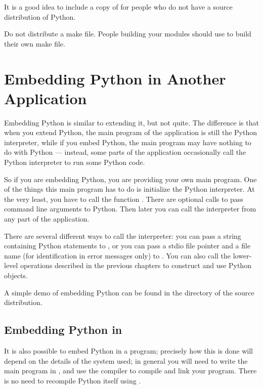 \documentclass{manual}
\begin{document}
It is a good idea to include a copy of  for
people who do not have a source distribution of Python.

Do not distribute a make file.  People building your modules
should use  to build their own make file.


\chapter{Embedding Python in Another Application
         \label{embedding}}

Embedding Python is similar to extending it, but not quite.  The
difference is that when you extend Python, the main program of the
application is still the Python interpreter, while if you embed
Python, the main program may have nothing to do with Python ---
instead, some parts of the application occasionally call the Python
interpreter to run some Python code.

So if you are embedding Python, you are providing your own main
program.  One of the things this main program has to do is initialize
the Python interpreter.  At the very least, you have to call the
function .  There are optional calls to
pass command line arguments to Python.  Then later you can call the
interpreter from any part of the application.

There are several different ways to call the interpreter: you can pass
a string containing Python statements to
, or you can pass a stdio file pointer
and a file name (for identification in error messages only) to
.  You can also call the lower-level
operations described in the previous chapters to construct and use
Python objects.

A simple demo of embedding Python can be found in the directory
 of the source distribution.


\section{Embedding Python in \Cpp{}
         \label{embeddingInCplusplus}}

It is also possible to embed Python in a \Cpp{} program; precisely how this
is done will depend on the details of the \Cpp{} system used; in general you
will need to write the main program in \Cpp{}, and use the \Cpp{} compiler
to compile and link your program.  There is no need to recompile Python
itself using \Cpp{}.
\end{document}
